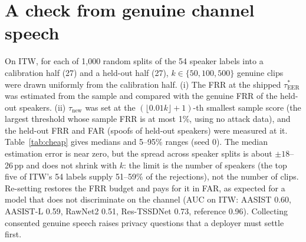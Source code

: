 \documentclass[10pt]{article}
\newcommand{\tauE}{\tau^{*}_{\mathrm{EER}}}
\newcommand{\wide}[1]{\begingroup\footnotesize\setlength{\tabcolsep}{3.5pt}\resizebox{\textwidth}{!}{}\endgroup}
\begin{document}
\begin{table}[!ht]
\caption{Trimming both ends of every clip (\(T=35\)\,dB), LA19 evaluation and ITW. Columns three to five: FRR/FAR (\%) with (HTER \%, TTG pp) at
the registered threshold on untrimmed audio, at the same threshold on trimmed audio, and at the threshold re-set on trimmed dev scores (trimmed
audio).}
\label{tab:trim}
\centering
\wide{s_tab_trim}
\end{table}

\section{A check from genuine channel speech}
\label{sec:cheap}
On ITW, for each of 1,000 random splits of the 54 speaker labels into a calibration half (27) and a held-out half (27), \(k\in\{50,100,500\}\)
genuine clips were drawn uniformly from the calibration half. (i) The FRR at the shipped \(\tauE\) was estimated from the sample and compared
with the genuine FRR of the held-out speakers. (ii) \(\tau_{\mathrm{new}}\) was set at the \((\lfloor 0.01k\rfloor+1)\)-th smallest sample
score (the largest threshold whose sample FRR is at most 1\%, using no attack data), and the held-out FRR and FAR (spoofs of held-out speakers) were
measured at it. Table~\ref{tab:cheap} gives medians and 5--95\% ranges (seed 0). The median estimation error is near zero, but the spread across
speaker splits is about \(\pm18\)--26\,pp and does not shrink with \(k\): the limit is the number of speakers (the top five of ITW's 54
labels supply 51--59\% of the rejections), not the number of clips. Re-setting restores the FRR budget and pays for it in FAR, as expected
for a model that does not discriminate on the channel (AUC on ITW: AASIST 0.60, AASIST-L 0.59, RawNet2 0.51, Res-TSSDNet 0.73, reference 0.96).
Collecting consented genuine speech raises privacy questions that a deployer must settle first.

\begin{table}[!ht]
\caption{Genuine-speech check on ITW (1,000 speaker-disjoint splits). Estimate error = FRR estimated from the \(k\) calibration clips at the
shipped threshold minus the held-out FRR at it.}
\label{tab:cheap}
\centering
\wide{s_tab_cheap}
\end{table}
\end{document}
